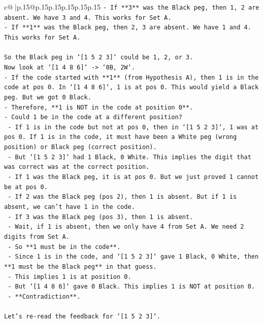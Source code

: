 \documentclass{article}
\begin{document}
{\begin{supertabular}{c@{$\;$}|p{.15\linewidth}@{}p{.15\linewidth}p{.15\linewidth}p{.15\linewidth}p{.15\linewidth}p{.15\linewidth}}
{{{\texttt{{-} If **3** was the Black peg, then 1, 2 are absent. We have 3 and 4. This works for Set A.} \\
\texttt{{-} If **1** was the Black peg, then 2, 3 are absent. We have 1 and 4. This works for Set A.} \\
\\ 
\texttt{So the Black peg in `{[}1 5 2 3{]}` could be 1, 2, or 3.} \\
\texttt{Now look at `{[}1 4 8 6{]}` {-}> `0B, 2W`.} \\
\texttt{{-} If the code started with **1** (from Hypothesis A), then 1 is in the code at pos 0. In `{[}1 4 8 6{]}`, 1 is at pos 0. This would yield a Black peg. But we got 0 Black.} \\
\texttt{{-} Therefore, **1 is NOT in the code at position 0**.} \\
\texttt{{-} Could 1 be in the code at a different position?} \\
\texttt{    {-} If 1 is in the code but not at pos 0, then in `{[}1 5 2 3{]}`, 1 was at pos 0. If 1 is in the code, it must have been a White peg (wrong position) or Black peg (correct position).} \\
\texttt{    {-} But `{[}1 5 2 3{]}` had 1 Black, 0 White. This implies the digit that was correct was at the correct position.} \\
\texttt{    {-} If 1 was the Black peg, it is at pos 0. But we just proved 1 cannot be at pos 0.} \\
\texttt{    {-} If 2 was the Black peg (pos 2), then 1 is absent. But if 1 is absent, we can't have 1 in the code.} \\
\texttt{    {-} If 3 was the Black peg (pos 3), then 1 is absent.} \\
\texttt{    {-} Wait, if 1 is absent, then we only have 4 from Set A. We need 2 digits from Set A.} \\
\texttt{    {-} So **1 must be in the code**.} \\
\texttt{    {-} Since 1 is in the code, and `{[}1 5 2 3{]}` gave 1 Black, 0 White, then **1 must be the Black peg** in that guess.} \\
\texttt{    {-} This implies 1 is at position 0.} \\
\texttt{    {-} But `{[}1 4 8 6{]}` gave 0 Black. This implies 1 is NOT at position 0.} \\
\texttt{    {-} **Contradiction**.} \\
\\ 
\texttt{Let's re{-}read the feedback for `{[}1 5 2 3{]}`.} \\
}}}
\end{supertabular}}
\end{document}

